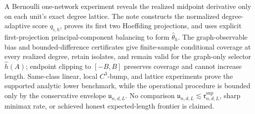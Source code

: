 A Bernoulli one-network experiment reveals the realized midpoint derivative only on each unit's exact degree lattice.  The note constructs the normalized degree-adaptive score \(q_{i,h}\), proves its first two Hoeffding projections, and uses explicit first-projection principal-component balancing to form \(\widehat\theta_h\).  The graph-observable bias and bounded-difference certificates give finite-sample conditional coverage at every realized degree, retain isolates, and remain valid for the graph-only selector \(\widehat h(A)\); endpoint clipping to \([-B,B]\) preserves coverage and cannot increase length.  Same-class linear, local \(C^3\)-bump, and lattice experiments prove the supported analytic lower benchmark, while the operational procedure is bounded only by the conservative envelope \(\mathfrak u_{n,d,L}\).  No comparison \(\mathfrak u_{n,d,L}\lesssim\mathfrak r^{\mathrm{sup}}_{n,d,L}\), sharp minimax rate, or achieved honest expected-length frontier is claimed.